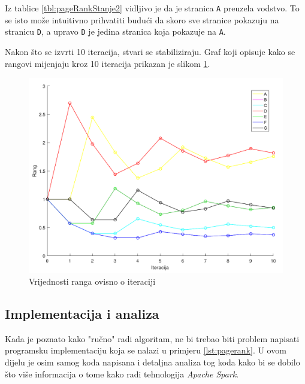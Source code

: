 \documentclass[times, utf8, zavrsni, numeric]{fer}
\begin{document}
Iz tablice \ref{tbl:pageRankStanje2} vidljivo je da je stranica \texttt{A} preuzela vodstvo. To se isto može intuitivno prihvatiti budući da skoro sve stranice pokazuju na stranicu \texttt{D}, a upravo \texttt{D} je jedina stranica koja pokazuje na \texttt{A}.

Nakon što se izvrti 10 iteracija, stvari se stabiliziraju. Graf koji opisuje kako se rangovi mijenjaju kroz 10 iteracija prikazan je slikom \ref{fig:grafRangIteracija}.

\begin{figure}[htb]
\centering
\includegraphics[scale = 0.5]{img/grafPageRankStraniceCropped.pdf}
\caption{Vrijednosti ranga ovisno o iteraciji}
\label{fig:grafRangIteracija}
\end{figure}

\subsection{Implementacija i analiza}
Kada je poznato kako "ručno" radi algoritam, ne bi trebao biti problem napisati programsku implementaciju koja se nalazi u primjeru \ref{lst:pagerank}. U ovom dijelu je osim samog koda napisana i detaljna analiza tog koda kako bi se dobilo što više informacija o tome kako radi tehnologija \emph{Apache Spark}. 
\end{document}

